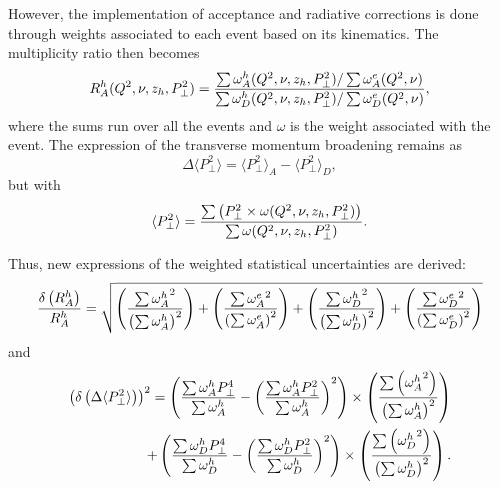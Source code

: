 However, the implementation of acceptance and radiative corrections is done through weights associated to each event based on its kinematics. The multiplicity ratio then becomes
\begin{equation}
R_A^h (Q^2,\nu,z_h,P_\perp^2) = {{\sum \omega_A^h (Q^2,\nu,z_h,P_\perp^2) / \sum \omega_A^e (Q^2,\nu)} 
                       \over {\sum \omega_D^h (Q^2,\nu,z_h,P_\perp^2) / \sum \omega_D^e (Q^2,\nu)}},
\end{equation}
where the sums run over all the events and $\omega$ is the weight associated with the event. The expression of the transverse momentum broadening remains as
\begin{equation}
\Delta \langle P_\perp^2 \rangle = \langle P_\perp^2 \rangle_A - \langle P_\perp^2 \rangle_D,
\end{equation}
but with
\begin{equation}
\langle P_\perp^2 \rangle = {\sum \left ( P_\perp^2 \times \omega (Q^2,\nu,z_h,P_\perp^2) \right ) \over \sum \omega (Q^2,\nu,z_h,P_\perp^2)}.
\end{equation}

Thus, new expressions of the weighted statistical uncertainties are derived: 
\begin{equation}
{\delta \left ( R_A^h \right ) \over R_A^h} = 
      \sqrt{ \left ( {\sum {\omega^h_A}^2 \over \left (\sum \omega^h_A \right )^2} \right ) 
           + \left ( {\sum {\omega^e_A}^2 \over \left (\sum \omega^e_A \right )^2} \right ) 
           + \left ( {\sum {\omega^h_D}^2 \over \left (\sum \omega^h_D \right )^2} \right ) 
           + \left ( {\sum {\omega^e_D}^2 \over \left (\sum \omega^e_D \right )^2} \right ) }
\end{equation}
 and 
\begin{equation}
\begin{split}
\left ( \delta \left ( \Delta \langle P_\perp^2 \rangle \right ) \right )^2 = 
   \left ({{\sum \omega^h_A P_\perp^4 }\over{\sum \omega^h_A}} 
 - \left ({\sum \omega^h_A P_\perp^2 }\over{\sum \omega^h_A}\right )^2 \right ) 
         \times \left ( {\sum \left ( {\omega^h_A}^2 \right ) \over 
                \left ( \sum \omega^h_A \right ) ^2 }\right ) \\
 + \left ({{\sum \omega^h_D P_\perp^4 }\over{\sum \omega^h_D}} 
 - \left ({\sum \omega^h_D P_\perp^2 }\over{\sum \omega^h_D}\right )^2 \right ) 
	 \times \left ( {\sum \left ( {\omega^h_D}^2 \right ) 
          \over \left ( \sum \omega^h_D \right ) ^2 }\right ).
\end{split}
\end{equation}

